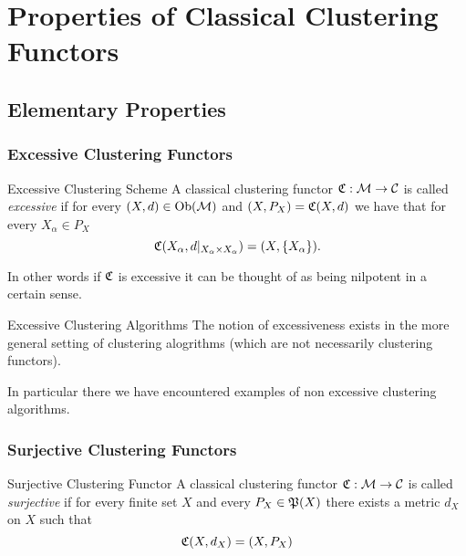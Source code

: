 \chapter{Properties of Classical Clustering Functors}

\section{Elementary Properties}
\subsection{Excessive Clustering Functors}
\begin{definition}{Excessive Clustering Scheme}{}
A classical clustering functor $\Cf: \M \to \C$ is called \emph{excessive} if for every $(X,d) \in \ob(\M)$ and $(X,P_X) = \Cf(X,d)$ we have that for every $X_\alpha \in P_X$
\begin{equation*}
    \Cf(X_\alpha, d|_{X_\alpha \times X_\alpha}) = (X,\{X_\alpha\}).
\end{equation*}
\end{definition}
In other words if $\Cf$ is excessive it can be thought of as being nilpotent in a certain sense.

\begin{myremark}{Excessive Clustering Algorithms}{}
The notion of excessiveness exists in the more general setting of clustering alogrithms (which are not necessarily clustering functors).
\end{myremark}

In particular there we have encountered examples of non excessive clustering algorithms.



\subsection{Surjective Clustering Functors}
\begin{definition}{Surjective Clustering Functor}{}
A classical clustering functor $\Cf: \M \to \C$ is called \emph{surjective} if for every finite set $X$ and every $P_X \in \P(X)$ there exists a metric $d_X$ on $X$ such that
\begin{equation*}
    \Cf(X,d_X) = (X,P_X)
\end{equation*}
\end{definition}

